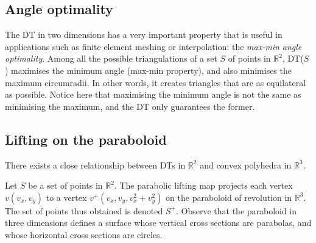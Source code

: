 %
\subsection{Angle optimality}
The DT in two dimensions has a very important property that is useful in applications such as finite element meshing or interpolation: the \emph{max-min angle optimality}. Among all the possible triangulations of a set $S$ of points in $\mathbb{R}^2$, DT($S$) maximises the minimum angle (max-min property), and also minimises the maximum circumradii. 
In other words, it creates triangles that are as equilateral as possible. 
Notice here that maximising the minimum angle is not the same as minimising the maximum, and the DT only guarantees the former.


\subsection{Lifting on the paraboloid}%
\label{sec:parabolic_lifting}

There exists a close relationship between DTs in $\mathbb{R}^{2}$ and convex polyhedra in $\mathbb{R}^{3}$. 

Let $S$ be a set of points in $\mathbb{R}^{2}$. 
The parabolic lifting map projects each vertex $v(v_{x}, v_{y})$ to a vertex $v^{+}(v_{x}, v_{y}, v_{x}^{2}+v_{y}^{2})$ on the paraboloid of revolution in $\mathbb{R}^{3}$. 
The set of points thus obtained is denoted $S^{+}$. 
Observe that the paraboloid in three dimensions defines a surface whose vertical cross sections are parabolas, and whose horizontal cross sections are circles. 

%

